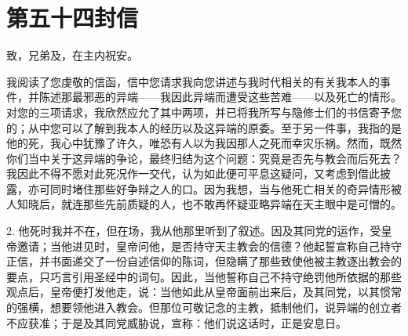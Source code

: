 

\section{第五十四封信}

\par

致，兄弟及，在主内祝安。\par

我阅读了您虔敬的信函，信中您请求我向您讲述与我时代相关的有关我本人的事件，并陈述那最邪恶的异端——我因此异端而遭受这些苦难——以及死亡的情形。对您的三项请求，我欣然应允了其中两项，并已将我所写与隐修士们的书信寄予您的；从中您可以了解到我本人的经历以及这异端的原委。至于另一件事，我指的是他的死，我心中犹豫了许久，唯恐有人以为我因那人之死而幸灾乐祸。然而，既然你们当中关于这异端的争论，最终归结为这个问题：究竟是否先与教会而后死去？我因此不得不愿对此死况作一交代，认为如此便可平息这疑问，又考虑到借此披露，亦可同时堵住那些好争辩之人的口。因为我想，当与他死亡相关的奇异情形被人知晓后，就连那些先前质疑的人，也不敢再怀疑亚略异端在天主眼中是可憎的。\par

2. 他死时我并不在，但在场，我从他那里听到了叙述。因及其同党的运作，受皇帝邀请；当他进见时，皇帝问他，是否持守天主教会的信德？他起誓宣称自己持守正信，并书面递交了一份自述信仰的陈词，但隐瞒了那些致使他被主教逐出教会的要点，只巧言引用圣经中的词句。因此，当他誓称自己不持守绝罚他所依据的那些观点后，皇帝便打发他走，说：当他如此从皇帝面前出来后，及其同党，以其惯常的强横，想要领他进入教会。但那位可敬记念的主教，抵制他们，说异端的创立者不应获准；于是及其同党威胁说，宣称：他们说这话时，正是安息日。\par

